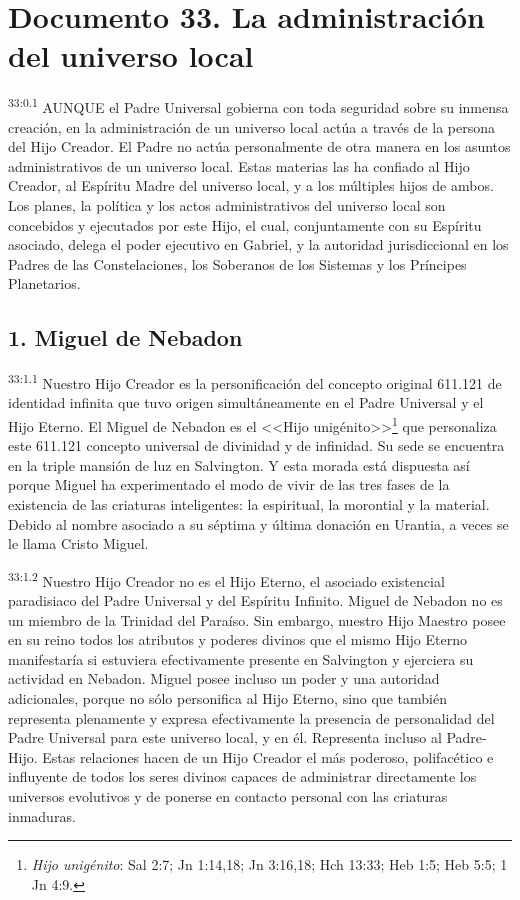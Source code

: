 \chapter{Documento 33. La administración del universo local}
\par
\textsuperscript{33:0.1} AUNQUE el Padre Universal gobierna con toda seguridad sobre su inmensa creación, en la administración de un universo local actúa a través de la persona del Hijo Creador. El Padre no actúa personalmente de otra manera en los asuntos administrativos de un universo local. Estas materias las ha confiado al Hijo Creador, al Espíritu Madre del universo local, y a los múltiples hijos de ambos. Los planes, la política y los actos administrativos del universo local son concebidos y ejecutados por este Hijo, el cual, conjuntamente con su Espíritu asociado, delega el poder ejecutivo en Gabriel, y la autoridad jurisdiccional en los Padres de las Constelaciones, los Soberanos de los Sistemas y los Príncipes Planetarios.

\section*{1. Miguel de Nebadon}
\par
\textsuperscript{33:1.1} Nuestro Hijo Creador es la personificación del concepto original
611.121 de identidad infinita que tuvo origen simultáneamente en el Padre Universal y el Hijo Eterno. El Miguel de Nebadon es el <<Hijo unigénito>>\footnote{\textit{Hijo unigénito}: Sal 2:7; Jn 1:14,18; Jn 3:16,18; Hch 13:33; Heb 1:5; Heb 5:5; 1 Jn 4:9.} que personaliza este 611.121{\textordmasculine} concepto universal de divinidad y de infinidad. Su sede se encuentra en la triple mansión de luz en Salvington. Y esta morada está dispuesta así porque Miguel ha experimentado el modo de vivir de las tres fases de la existencia de las criaturas inteligentes: la espiritual, la morontial y la material. Debido al nombre asociado a su séptima y última donación en Urantia, a veces se le llama Cristo Miguel.

\par
\textsuperscript{33:1.2} Nuestro Hijo Creador no es el Hijo Eterno, el asociado existencial paradisiaco del Padre Universal y del Espíritu Infinito. Miguel de Nebadon no es un miembro de la Trinidad del Paraíso. Sin embargo, nuestro Hijo Maestro posee en su reino todos los atributos y poderes divinos que el mismo Hijo Eterno manifestaría si estuviera efectivamente presente en Salvington y ejerciera su actividad en Nebadon. Miguel posee incluso un poder y una autoridad adicionales, porque no sólo personifica al Hijo Eterno, sino que también representa plenamente y expresa efectivamente la presencia de personalidad del Padre Universal para este universo local, y en él. Representa incluso al Padre-Hijo. Estas relaciones hacen de un Hijo Creador el más poderoso, polifacético e influyente de todos los seres divinos capaces de administrar directamente los universos evolutivos y de ponerse en contacto personal con las criaturas inmaduras.

